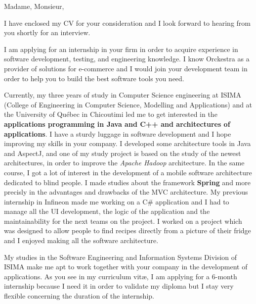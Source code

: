 
\date{\today}
\opening{Madame, Monsieur,}
\closing{I have enclosed my CV for your consideration and I look forward to hearing from you shortly for an interview.}

\makelettertitle

I am applying for an internship in your firm in order to acquire experience in software development, testing, and engineering knowledge. I know Orckestra as a provider of solutions for e-commerce and I would join your development team in order to help you to build the best software tools you need.

Currently, my three years of study in Computer Science engineering at ISIMA (College of Engineering in Computer Science, Modelling and Applications) and at the University of Québec in Chicoutimi led me to get interested in the \textbf{applications programming in Java and C++ and architectures of applications}. I have a sturdy luggage in software development and I hope improving my skills in your company. I developed some architecture tools in Java and AspectJ, and one of my study project is based on the study of the newest architectures, in order to improve the \textit{Apache Hadoop} architecture. In the same course, I got a lot of interest in the development of a mobile software architecture dedicated to blind people. I made studies about the framework \textbf{Spring} and more precisly in the advantages and drawbacks of the MVC architecture. My previous internship in Infineon made me working on a C\# application and I had to manage all the UI development, the logic of the application and the maintainability for the next teams on the project. I worked on a project which was designed to allow people to find recipes directly from a picture of their fridge and I enjoyed making all the software architecture.

My studies in the Software Engineering and Information Systems Division of ISIMA make me apt to work together with your company in the development of applications. As you see in my curriculum vit\ae{}, I am applying for a 6-month internship because I need it in order to validate my diploma but I stay very flexible concerning the duration of the internship.

\makeletterclosing
